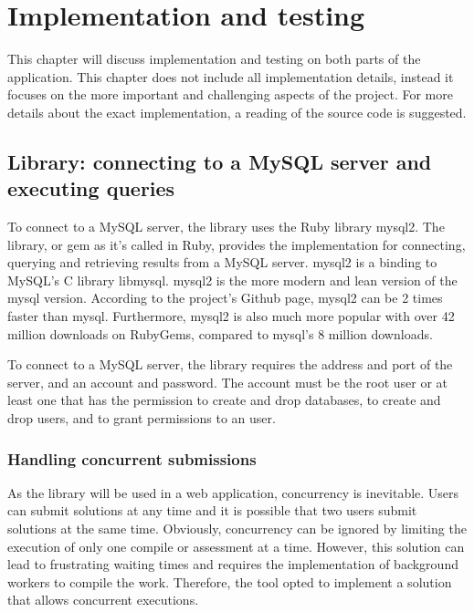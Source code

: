 \chapter{Implementation and testing}

This chapter will discuss implementation and testing on both parts of the application. This chapter does not include all implementation details, instead it focuses on the more important and challenging aspects of the project. For more details about the exact implementation, a reading of the source code is suggested.

\section{Library: connecting to a MySQL server and executing queries} \label{ch:impllib:sec:connecting}
To connect to a MySQL server, the library uses the Ruby library mysql2. The library, or gem as it's called in Ruby, provides the implementation for connecting, querying and retrieving results from a MySQL server. mysql2 is a binding to MySQL's C library libmysql. mysql2 is the more modern and lean version of the mysql version. According to the project's Github page, mysql2 can be 2 times faster than mysql. Furthermore, mysql2 is also much more popular with over 42 million downloads on RubyGems, compared to mysql's 8 million downloads.

To connect to a MySQL server, the library requires the address and port of the server, and an account and password. The account must be the root user or at least one that has the permission to create and drop databases, to create and drop users, and to grant permissions to an user.

\subsection{Handling concurrent submissions}

As the library will be used in a web application, concurrency is inevitable. Users can submit solutions at any time and it is possible that two users submit solutions at the same time. Obviously, concurrency can be ignored by limiting the execution of only one compile or assessment at a time. However, this solution can lead to frustrating waiting times and requires the implementation of background workers to compile the work. Therefore, the tool opted to implement a solution that allows concurrent executions.

